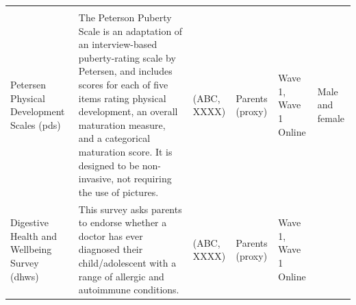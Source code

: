 \documentclass[]{book}
\begin{document}
\begin{longtable}[]{@{}llllll@{}}
\begin{minipage}[t]{0.10\columnwidth}
\strut
\end{minipage}\tabularnewline
\begin{minipage}[t]{0.18\columnwidth}\raggedright
Petersen Physical Development Scales (pds)\strut
\end{minipage} & \begin{minipage}[t]{0.18\columnwidth}\raggedright
The Peterson Puberty Scale is an adaptation of an interview-based puberty-rating scale by Petersen, and includes scores for each of five items rating physical development, an overall maturation measure, and a categorical maturation score. It is designed to be non-invasive, not requiring the use of pictures.\strut
\end{minipage} & \begin{minipage}[t]{0.15\columnwidth}\raggedright
(ABC, XXXX)\strut
\end{minipage} & \begin{minipage}[t]{0.16\columnwidth}\raggedright
Parents (proxy)\strut
\end{minipage} & \begin{minipage}[t]{0.06\columnwidth}\raggedright
Wave 1, Wave 1 Online\strut
\end{minipage} & \begin{minipage}[t]{0.10\columnwidth}\raggedright
Male and female\strut
\end{minipage}\tabularnewline
\begin{minipage}[t]{0.18\columnwidth}\raggedright
Digestive Health and Wellbeing Survey (dhws)\strut
\end{minipage} & \begin{minipage}[t]{0.18\columnwidth}\raggedright
This survey asks parents to endorse whether a doctor has ever diagnosed their child/adolescent with a range of allergic and autoimmune conditions.\strut
\end{minipage} & \begin{minipage}[t]{0.15\columnwidth}\raggedright
(ABC, XXXX)\strut
\end{minipage} & \begin{minipage}[t]{0.16\columnwidth}\raggedright
Parents (proxy)\strut
\end{minipage} & \begin{minipage}[t]{0.06\columnwidth}\raggedright
Wave 1, Wave 1 Online\strut
\end{minipage} & \begin{minipage}[t]{0.10\columnwidth}\raggedright
\strut
\end{minipage}\tabularnewline

\end{longtable}
\end{document}

